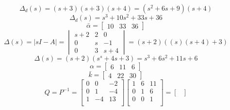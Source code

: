 \begin{enumerate}
\begin{enumerate}
\begin{equation}
        \Delta_d(s) =
        (s+3)(s+3)(s+4) =
        (s^2 + 6s + 9)(s + 4)
      \end{equation}
      \begin{equation}
        \Delta_d(s) =
        s^3 + 10s^2 + 33s + 36
      \end{equation}
      \begin{equation}
        \bar \alpha =
        \begin{bmatrix}
          10 & 33 & 36
        \end{bmatrix}
      \end{equation}
      \begin{equation}
        \Delta(s) = \vert sI -A \vert =
        \begin{vmatrix}
          s + 2 & 2 & 0 \\
          0 & s & -1 \\
          0 & 3 & s + 4
        \end{vmatrix} =
        (s+2)( (s)(s+4) + 3 )
      \end{equation}
      \begin{equation}
        \Delta(s) = 
        (s+2)( s^s+4s + 3 ) =
        s^3 + 6s^2 + 11s + 6
      \end{equation}
      \begin{equation}
        \alpha =
        \begin{bmatrix}
          6 & 11 & 6
        \end{bmatrix}
      \end{equation}
      \begin{equation}
        \bar k =
        \begin{bmatrix}
          4 & 22 & 30
        \end{bmatrix}
      \end{equation}
      \begin{equation}
        Q = P^{-1} =
        \begin{bmatrix}
          0 & 0 & -2 \\
          0 & 1 & -4 \\
          1 & -4 & 13 \\
        \end{bmatrix}
        \begin{bmatrix}
          1 & 6 & 11 \\
          0 & 1 & 6 \\
          0 & 0 & 1 \\
        \end{bmatrix} =
        \begin{bmatrix}

\end{bmatrix}
\end{equation}
\end{enumerate}
\end{enumerate}
